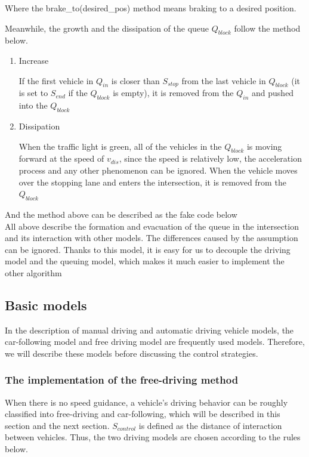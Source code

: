 \documentclass[a4paper]{paper}
\begin{document}


Where the brake\_to(desired\_pos) method means braking to a desired position.

Meanwhile, the growth and the dissipation of the queue $Q_{block}$ follow the method below.

\begin{enumerate}
\item Increase

If the first vehicle in $Q_{in}$ is closer than $S_{stop}$ from the last vehicle in $Q_{block}$ (it is set to $S_{end}$ if the $Q_{block}$ is empty), it is removed from the $Q_{in}$ and pushed into the $Q_{block}$

\item Dissipation

When the traffic light is green, all of the vehicles in the $Q_{block}$ is moving forward at the speed of $v_{dis}$, since the speed is relatively low, the acceleration process and any other phenomenon can be ignored. When the vehicle moves over the stopping lane and enters the intersection, it is removed from the $Q_{block}$
\end{enumerate}
And the method above can be described as the fake code below\\



All above describe the formation and evacuation of the queue in the intersection and its interaction with other models. The differences caused by the assumption can be ignored. Thanks to this model, it is easy for us to decouple the driving model and the queuing model, which makes it much easier to implement the other algorithm
\subsection{Basic models}
In the description of manual driving and automatic driving vehicle models, the car-following model and free driving model are frequently used models. Therefore, we will describe these models before discussing the control strategies.

\subsubsection{The implementation of the free-driving method}

When there is no speed guidance, a vehicle's driving behavior can be roughly classified into free-driving and car-following, which will be described in this section and the next section. $S_{control}$ is defined as the distance of interaction between vehicles. Thus, the two driving models are chosen according to the rules below.
\end{document}
